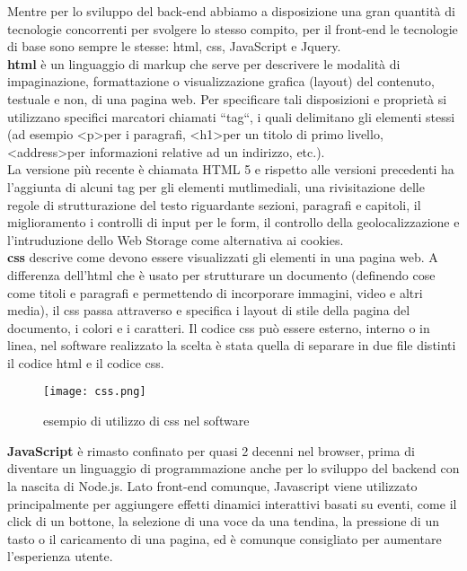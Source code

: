 Mentre per lo sviluppo del back-end abbiamo a disposizione una gran quantità di tecnologie concorrenti per svolgere lo stesso compito, per il front-end le tecnologie di base sono sempre le stesse: \Gls{html}, \Gls{css}, JavaScript e Jquery.
\\
\textbf{\Gls{html}} è un linguaggio di markup che serve per descrivere le modalità di impaginazione, formattazione o visualizzazione grafica (layout) del contenuto, testuale e non, di una pagina web.
Per specificare tali disposizioni e proprietà si utilizzano specifici marcatori chiamati “tag“, i quali delimitano gli elementi stessi (ad esempio \textless p\textgreater  per i paragrafi, \textless h1\textgreater  per un titolo di primo livello, \textless  address\textgreater  per informazioni relative ad un indirizzo, etc.).\\
La versione più recente è chiamata HTML 5 e rispetto alle versioni precedenti ha l'aggiunta di alcuni tag per gli elementi mutlimediali, una rivisitazione delle regole di strutturazione del testo riguardante sezioni, paragrafi e capitoli, il miglioramento i controlli di input per le form, il controllo della geolocalizzazione e l'intruduzione dello Web Storage come alternativa ai cookies.
\\
\textbf{\Gls{css}} descrive come devono essere visualizzati gli elementi in una pagina web. A differenza dell'\Gls{html} che è usato per strutturare un documento (definendo cose come titoli e paragrafi e permettendo di incorporare immagini, video e altri media), il \Gls{css} passa attraverso e specifica i layout di stile della pagina del documento, i colori e i caratteri. Il codice \Gls{css} può essere esterno, interno o in linea, nel software realizzato la scelta è stata quella di separare in due file distinti il codice \Gls{html} e il codice \Gls{css}.

\begin{figure}[H]
    \centering
    \texttt{[image: css.png]}
    \caption{esempio di utilizzo di css nel software}
    \label{fig:css}
\end{figure}

\textbf{JavaScript} è rimasto confinato per quasi 2 decenni nel browser, prima di diventare un linguaggio di programmazione anche per lo sviluppo del backend con la nascita di Node.js. Lato front-end comunque, Javascript viene utilizzato principalmente per aggiungere effetti dinamici interattivi basati su eventi, come il click di un bottone, la selezione di una voce da una tendina, la pressione di un tasto o il caricamento di una pagina, ed è comunque consigliato per aumentare l'esperienza utente. 

